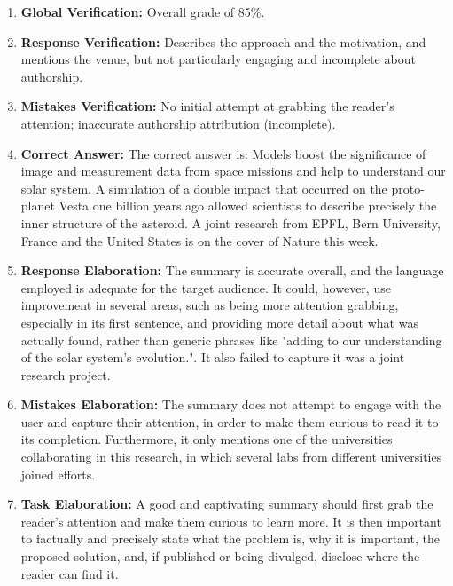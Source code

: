 \begin{enumerate}[label=\textbf{\arabic*.}]
\item \textbf{Global Verification:} Overall grade of 85\%.

\item \textbf{Response Verification:} Describes the approach and the motivation, and mentions the venue, but not particularly engaging and incomplete about authorship.

\item \textbf{Mistakes Verification:} No initial attempt at grabbing the reader's attention; inaccurate authorship attribution (incomplete).

\item \textbf{Correct Answer:} The correct answer is: Models boost the significance of image and measurement data from space missions and help to understand our solar system. A simulation of a double impact that occurred on the proto-planet Vesta one billion years ago allowed scientists to describe precisely the inner structure of the asteroid. A joint research from EPFL, Bern University, France and the United States is on the cover of Nature this week.

\item \textbf{Response Elaboration:} The summary is accurate overall, and the language employed is adequate for the target audience. It could, however, use improvement in several areas, such as being more attention grabbing, especially in its first sentence, and providing more detail about what was actually found, rather than generic phrases like "adding to our understanding of the solar system's evolution.". It also failed to capture it was a joint research project.

\item \textbf{Mistakes Elaboration:} The summary does not attempt to engage with the user and capture their attention, in order to make them curious to read it to its completion. Furthermore, it only mentions one of the universities collaborating in this research, in which several labs from different universities joined efforts.

\item \textbf{Task Elaboration:} A good and captivating summary should first grab the reader's attention and make them curious to learn more. It is then important to factually and precisely state what the problem is, why it is important, the proposed solution, and, if published or being divulged, disclose where the reader can find it.


\end{enumerate}
